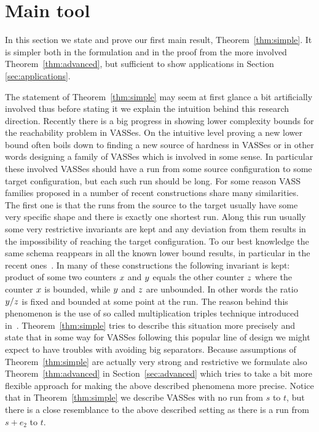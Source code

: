 \section{Main tool}\label{sec:simple}

In this section we state and prove our first main result, Theorem~\ref{thm:simple}.
It is simpler both in the formulation and in the proof from the more involved
Theorem~\ref{thm:advanced}, but sufficient to show applications in Section \ref{sec:applications}.

The statement of Theorem~\ref{thm:simple} may seem at first glance a bit artificially involved
thus before stating it we explain the intuition behind this research direction.
Recently there is a big progress in showing lower complexity bounds for the reachability problem
in VASSes. On the intuitive level proving a new lower bound often boils down to finding
a new source of hardness in VASSes or in other words designing a family of VASSes
which is involved in some sense. In particular these involved VASSes should have
a run from some source configuration to some target configuration,
but each such run should be long. For some reason VASS families proposed in a number of recent constructions
share many similarities. The first one is that the runs from the source to the target usually have some
very specific shape and there is exactly one shortest run. Along this run usually some very restrictive
invariants are kept and any deviation from them results in the impossibility of reaching the target configuration.
To our best knowledge the same schema reappears in all the known lower bound
results, in particular in the recent ones~\cite{DBLP:journals/jacm/CzerwinskiLLLM21,DBLP:conf/concur/Czerwinski0LLM20,DBLP:conf/focs/Leroux21,DBLP:conf/focs/CzerwinskiO21,DBLP:journals/corr/abs-2203-04243}.
In many of these constructions the following invariant is kept: product of some two counters
$x$ and $y$ equals the other counter $z$ where the counter $x$ is bounded,
while $y$ and $z$ are unbounded. In other words the ratio $y / z$ is fixed and bounded
at some point at the run. The reason behind this phenomenon is the use of so called
multiplication triples technique introduced in~\cite{DBLP:conf/stoc/CzerwinskiLLLM19}.
Theorem~\ref{thm:simple} tries to describe this situation more precisely and state that in some way for VASSes
following this popular line of design we might expect to have troubles with avoiding big separators.
Because assumptions of Theorem~\ref{thm:simple} are actually very strong and restrictive
we formulate also Theorem~\ref{thm:advanced} in Section~\ref{sec:advanced} which tries
to take a bit more flexible approach for making the above described phenomena more precise.
Notice that in Theorem~\ref{thm:simple} we describe VASSes with no run from $s$ to $t$, but
there is a close resemblance to the above described setting as there is a run from $s + e_2$ to $t$.

